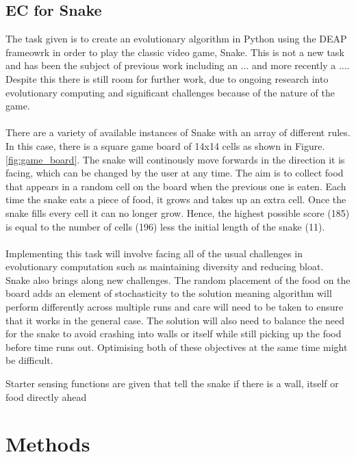 \documentclass{article}
\begin{document}
\subsection{EC for Snake}
The task given is to create an evolutionary algorithm in Python using the DEAP frameowrk in order to play the classic video game, Snake. This is not a new task and has been the subject of previous work including an ...\cite{snake_blog} and more recently a ...\cite{snake_paper}. Despite this there is still room for further work, due to ongoing research into evolutionary computing and significant challenges because of the nature of the game.
\\\\
There are a variety of available instances of Snake with an array of different rules. In this case, there is a square game board of 14x14 cells as shown in Figure. \ref{fig:game_board}. The snake will continously move forwards in the direction it is facing, which can be changed by the user at any time. The aim is to collect food that appears in a random cell on the board when the previous one is eaten. Each time the snake eats a piece of food, it grows and takes up an extra cell. Once the snake fills every cell it can no longer grow. Hence, the highest possible score (185) is equal to the number of cells (196) less the initial length of the snake (11).
\\\\
Implementing this task will involve facing all of the usual challenges in evolutionary computation such as maintaining diversity and reducing bloat. Snake also brings along new challenges. The random placement of the food on the board adds an element of stochasticity to the solution meaning algorithm will perform differently across multiple runs and care will need to be taken to ensure that it works in the general case. The solution will also need to balance the need for the snake to avoid crashing into walls or itself while still picking up the food before time runs out. Optimising both of these objectives at the same time might be difficult.

Starter sensing functions are given that tell the snake if there is a wall, itself or food directly ahead

\section{Methods} %
\end{document}
